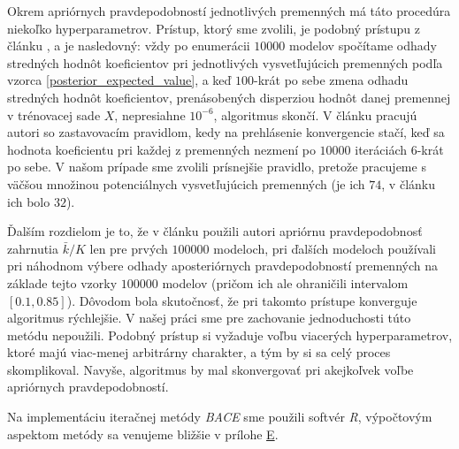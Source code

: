 Okrem apriórnych pravdepodobností jednotlivých premenných má táto procedúra niekoľko hyperparametrov.
Prístup, ktorý sme zvolili, je podobný prístupu z článku \cite{sala-i-martin}, a je nasledovný:
vždy po enumerácii \(10000\) modelov spočítame odhady stredných hodnôt koeficientov pri jednotlivých vysvetľujúcich premenných podľa vzorca \ref{posterior_expected_value},
a keď \(100\)-krát po sebe zmena odhadu stredných hodnôt koeficientov, prenásobených disperziou hodnôt danej premennej v trénovacej sade \(X\),
nepresiahne \(10^{-6}\), algoritmus skončí.
V článku \cite{sala-i-martin} pracujú autori so zastavovacím pravidlom, kedy na prehlásenie konvergencie stačí,
keď sa hodnota koeficientu pri každej z premenných nezmení po \(10000\) iteráciách \(6\)-krát po sebe.
V našom prípade sme zvolili prísnejšie pravidlo, pretože pracujeme s väčšou množinou potenciálnych vysvetľujúcich premenných
(je ich \(74\), v článku \cite{sala-i-martin} ich bolo \(32\)).

Ďalším rozdielom je to, že v článku \cite{sala-i-martin} použili autori apriórnu pravdepodobnosť zahrnutia \( \bar{k}/K \) len pre prvých \(100000\) modeloch,
pri ďalších modeloch používali pri náhodnom výbere odhady aposteriórnych pravdepodobností premenných na základe tejto vzorky \(100000\) modelov
(pričom ich ale ohraničili intervalom \([0.1, 0.85]\)).
Dôvodom bola skutočnosť, že pri takomto prístupe konverguje algoritmus rýchlejšie.
V našej práci sme pre zachovanie jednoduchosti túto metódu nepoužili.
Podobný prístup si vyžaduje voľbu viacerých hyperparametrov, ktoré majú viac-menej arbitrárny charakter, a tým by si sa celý proces skomplikoval.
Navyše, algoritmus by mal skonvergovať pri akejkoľvek voľbe apriórnych pravdepodobností.

Na implementáciu iteračnej metódy \emph{BACE} sme použili softvér \emph{R}, výpočtovým aspektom metódy sa venujeme bližšie v prílohe \hyperref[appendix:e]{E}.

